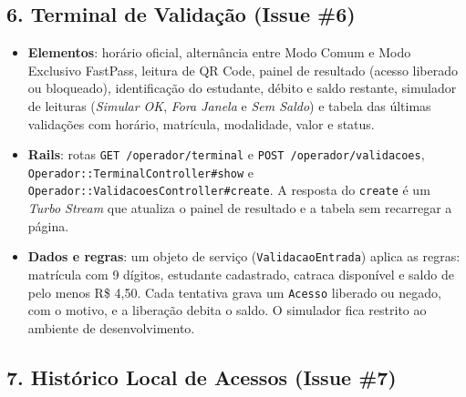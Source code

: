\documentclass[a4paper,12pt]{article}
\renewcommand{\_}{\textunderscore\allowbreak}
\begin{document}
\subsection*{6. Terminal de Validação (Issue \#6)}

\begin{itemize}

    \item \textbf{Elementos}: horário oficial, alternância entre Modo Comum e Modo Exclusivo FastPass, leitura de QR Code, painel de resultado (acesso liberado ou bloqueado), identificação do estudante, débito e saldo restante, simulador de leituras (\textit{Simular OK}, \textit{Fora Janela} e \textit{Sem Saldo}) e tabela das últimas validações com horário, matrícula, modalidade, valor e status.

    \item \textbf{Rails}: rotas \texttt{GET /operador/\allowbreak{}terminal} e \texttt{POST /operador/\allowbreak{}validacoes}, \texttt{Operador::\allowbreak{}TerminalController\#\allowbreak{}show} e \texttt{Operador::\allowbreak{}ValidacoesController\#\allowbreak{}create}. A resposta do \texttt{create} é um \textit{Turbo Stream} que atualiza o painel de resultado e a tabela sem recarregar a página.

    \item \textbf{Dados e regras}: um objeto de serviço (\texttt{ValidacaoEntrada}) aplica as regras: matrícula com 9 dígitos, estudante cadastrado, catraca disponível e saldo de pelo menos R\$ 4,50. Cada tentativa grava um \texttt{Acesso} liberado ou negado, com o motivo, e a liberação debita o saldo. O simulador fica restrito ao ambiente de desenvolvimento.

\end{itemize}

\subsection*{7. Histórico Local de Acessos (Issue \#7)}
\end{document}
